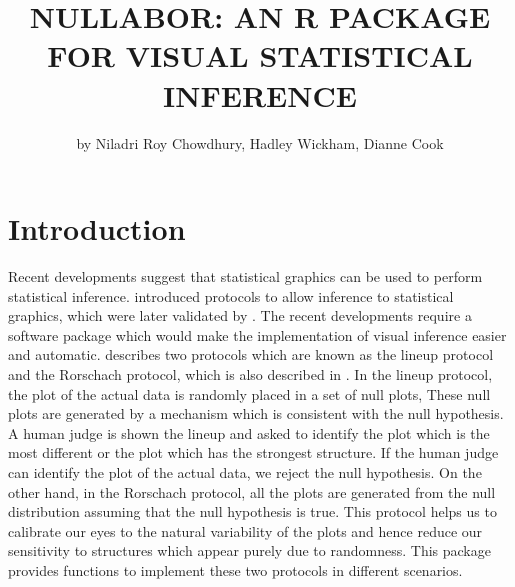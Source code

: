 \title{NULLABOR: AN R PACKAGE FOR VISUAL STATISTICAL INFERENCE}
\author{by Niladri Roy Chowdhury, Hadley Wickham, Dianne Cook}

\maketitle


\section{Introduction}\label{introduction}

Recent developments suggest that statistical graphics can be used to perform statistical inference. \cite{buja:2009} introduced protocols to allow inference to statistical graphics, which were later validated by \cite{majumder:2013}. The recent developments require a software package which would make the implementation of visual inference easier and automatic. \cite{buja:2009} describes two protocols which are known as the lineup protocol and the Rorschach protocol, which is also described in \cite{hadley:2010}. In the lineup protocol, the plot of the actual data is randomly placed in a set of null plots, These null plots are generated by a mechanism which is consistent with the null hypothesis. A human judge is shown the lineup and asked to identify the plot which is the most different or the plot which has the strongest structure. If the human judge can identify the plot of the actual data, we reject the null hypothesis. On the other hand, in the Rorschach protocol, all the plots are generated from the null distribution assuming that the null hypothesis is true. This protocol helps us to calibrate our eyes to the natural variability of the plots and hence reduce our sensitivity to structures which appear purely due to randomness. This package provides functions to implement these two protocols in different scenarios. 

